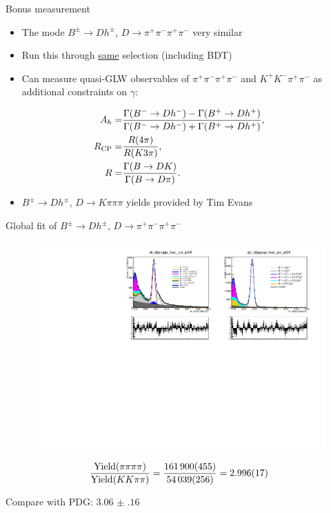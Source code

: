 \documentclass{beamer}
\begin{document}
\begin{frame}{Bonus measurement}
  \begin{itemize}
    \setlength\itemsep{1em}
    \item{The mode $B^\pm\to Dh^\pm$, $D\to\pi^+\pi^-\pi^+\pi^-$ very similar}
    \item{Run this through \underline{same} selection (including BDT)}
    \item{Can measure quasi-GLW observables of $\pi^+\pi^-\pi^+\pi^-$ and $K^+K^-\pi^+\pi^-$ as additional constraints on $\gamma$:}
  \end{itemize}
  \begin{align*}
    A_h =& \frac{\Gamma(B^-\to Dh^-) - \Gamma(B^+\to Dh^+)}{\Gamma(B^-\to Dh^-) + \Gamma(B^+\to Dh^+)}, \\
    R_{\rm CP} =& \frac{R(4\pi)}{R(K3\pi)}, \\
    R =& \frac{\Gamma(B\to DK)}{\Gamma(B\to D\pi)}.
  \end{align*}
  \begin{itemize}
    \item{$B^\pm\to Dh^\pm$, $D\to K\pi\pi\pi$ yields provided by Tim Evans}
  \end{itemize}
\end{frame}

\begin{frame}{Global fit of $B^\pm\to Dh^\pm$, $D\to\pi^+\pi^-\pi^+\pi^-$}
  \vspace{-0.3cm}
  \begin{figure}
    \centering
    \includegraphics[width = 1.0\textwidth]{Plots/d2pipipipi_fiveL_allDP.pdf}
  \end{figure}
  \vspace{-0.2cm}
  \begin{equation*}
    \frac{{\rm Yield}(\pi\pi\pi\pi)}{{\rm Yield}(KK\pi\pi)} = \frac{\SI{161900(455)}{}}{\SI{54039(256)}{}} = \SI{2.996(17)}{}
  \end{equation*}
  \begin{center}
    Compare with PDG: $\SI{3.06(16)}{}$
  \end{center}
\end{frame}
\end{document}
